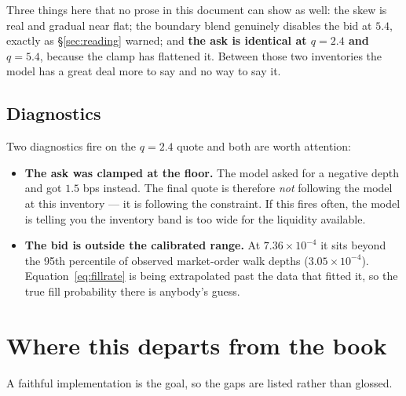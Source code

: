 \documentclass[11pt,a4paper]{article}
\begin{document}
\noindent Three things here that no prose in this document can show as well: the
skew is real and gradual near flat; the boundary blend genuinely disables the bid
at $5.4$, exactly as \S\ref{sec:reading} warned; and \textbf{the ask is identical
at $q=2.4$ and $q=5.4$}, because the clamp has flattened it. Between those two
inventories the model has a great deal more to say and no way to say it.

\subsection{Diagnostics}

Two diagnostics fire on the $q=2.4$ quote and both are worth attention:

\begin{itemize}
  \item \textbf{The ask was clamped at the floor.} The model asked for a negative
    depth and got $1.5$ bps instead. The final quote is therefore \emph{not}
    following the model at this inventory --- it is following the constraint. If
    this fires often, the model is telling you the inventory band is too wide for
    the liquidity available.
  \item \textbf{The bid is outside the calibrated range.}
    At $7.36\times10^{-4}$ it sits beyond the 95th percentile of observed
    market-order walk depths ($3.05\times10^{-4}$). Equation~\eqref{eq:fillrate}
    is being extrapolated past the data that fitted it, so the true fill
    probability there is anybody's guess.
\end{itemize}

\section{Where this departs from the book}
\label{sec:departures}

A faithful implementation is the goal, so the gaps are listed rather than
glossed.
\end{document}
